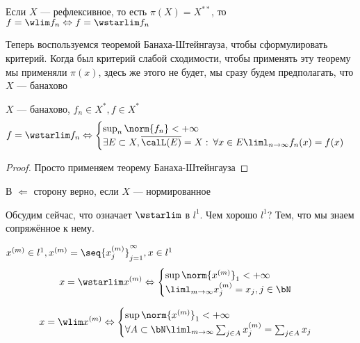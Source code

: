 \documentclass[document]{subfiles}
\begin{document}
\begin{remark}
    Если $X$ --- рефлексивное, то есть $\pi(X) = X^{**}$, то $f = \wlim f_n \Leftrightarrow f = \wstarlim f_n$
\end{remark}

Теперь воспользуемся теоремой Банаха-Штейнгауза, чтобы сформулировать критерий. Когда был критерий слабой сходимости, чтобы применять эту теорему 
мы применяли $\pi(x)$, здесь же этого не будет, мы сразу будем предполагать, что $X$ --- банахово
\begin{theorem}
    $X$ --- банахово, $f_n \in X^*, f \in X^*$
    \[ f = \wstarlim f_n \Leftrightarrow \begin{cases}
        \sup_n \norm{f_n} < +\infty \\
        \exists E \subset X, \overline{\calL(E)} = X : \: \forall x \in E \liml_{n \to \infty} f_n(x) = f(x)
    \end{cases}
    \] 
\end{theorem}

\begin{proof}
    Просто применяем теорему Банаха-Штейнгауза
\end{proof}

\begin{remark}
    В $\Leftarrow$ сторону верно, если $X$ --- нормированное
\end{remark}

Обсудим сейчас, что означает $\wstarlim$ в $l^1$. Чем хорошо $l^1$? Тем, что мы знаем сопряжённое к нему.

\begin{theoremwobox}
    $x^{(m)} \in l^1, x^{(m)} = \seq{x^{(m)}_j}^\infty_{j=1}, x \in l^1$
    \[ x = \wstarlim x^{(m)} \Leftrightarrow \begin{cases}
        \sup \norm{x^{(m)}}_1 < +\infty \\
        \liml_{m \to \infty} x^{(m)}_j = x_j, j \in \bN
    \end{cases} \]

    \[ x = \wlim x^{(m)} \Leftrightarrow \begin{cases}
        \sup \norm{x^{(m)}}_1 < +\infty \\
        \forall A \subset \bN \liml_{m \to \infty} \sum_{j \in A} x^{(m)}_j = \sum_{j \in A} x_j
    \end{cases} \]
\end{theoremwobox}
\end{document}
